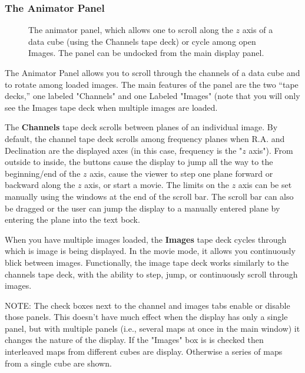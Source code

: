 \subsubsection{The Animator Panel}

\begin{figure}[h!]
\begin{center}
\caption{\label{fig:viewer_animator} The animator panel, which allows one to scroll along the $z$ axis of a data cube (using the Channels tape deck) 
or cycle among open Images. The panel can be undocked from the main display panel.}
\hrulefill
\end{center}
\end{figure}

The Animator Panel allows you to scroll through the channels of a data
cube and to rotate among loaded images. The main features of the
panel are the two ``tape decks,'' one labeled "Channels" and one Labeled "Images"
(note that you will only see the Images tape deck when multiple images are loaded.  

The {\bf Channels} tape deck scrolls between planes of an individual image. By default, the
channel tape deck scrolls among frequency planes when R.A. and
Declination are the displayed axes (in this case, frequency is the "$z$ axis"). From 
outside to inside, the buttons cause the display to jump all the way to the beginning/end of the $z$ axis,
cause the viewer to step one plane forward or backward along the $z$ axis,
or start a movie. The limits on the $z$ axis can be set manually using the windows at the end
of the scroll bar. The scroll bar can also be dragged or the user can jump the display to a manually
entered plane by entering the plane into the text bock.

When you have multiple images loaded, the {\bf Images} tape deck cycles through 
which is image is being displayed. In the movie mode, it allows you continuously blick
between images. Functionally, the image tape deck works similarly to the channels tape deck,
with the ability to step, jump, or continuously scroll through images.

NOTE: The check boxes next to the channel and images tabs enable or disable those panels. This doesn't
have much effect when the display has only a single panel, but with multiple panels (i.e., several 
maps at once in the main window) it changes the nature of the display. If the "Images" box is is 
checked then interleaved maps from different cubes are display. Otherwise a series of maps from a 
single cube are shown.

